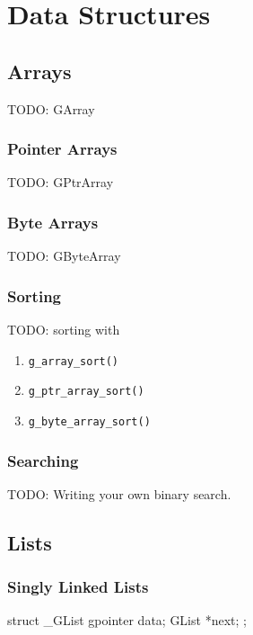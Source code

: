 \chapter{Data Structures}

\section{Arrays}

TODO: GArray

\subsection{Pointer Arrays}

TODO: GPtrArray

\subsection{Byte Arrays}

TODO: GByteArray

\subsection{Sorting}

TODO: sorting with

\begin{enumerate}
\item \verb|g_array_sort()|
\item \verb|g_ptr_array_sort()|
\item \verb|g_byte_array_sort()|
\end{enumerate}

\subsection{Searching}

TODO: Writing your own binary search.

\section{Lists}

\subsection{Singly Linked Lists}

\begin{code}{}
struct _GList
{
    gpointer data;
    GList *next;
};
\end{code}


